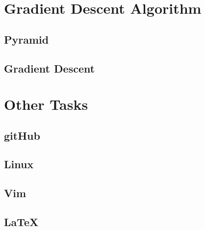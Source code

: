 \section{Gradient Descent Algorithm}

\subsection{Pyramid}

\subsection{Gradient Descent}





\section{Other Tasks}\label{FillingFile}

\subsection{gitHub}

\subsection{Linux}

\subsection{Vim}

\subsection{\LaTeX}




